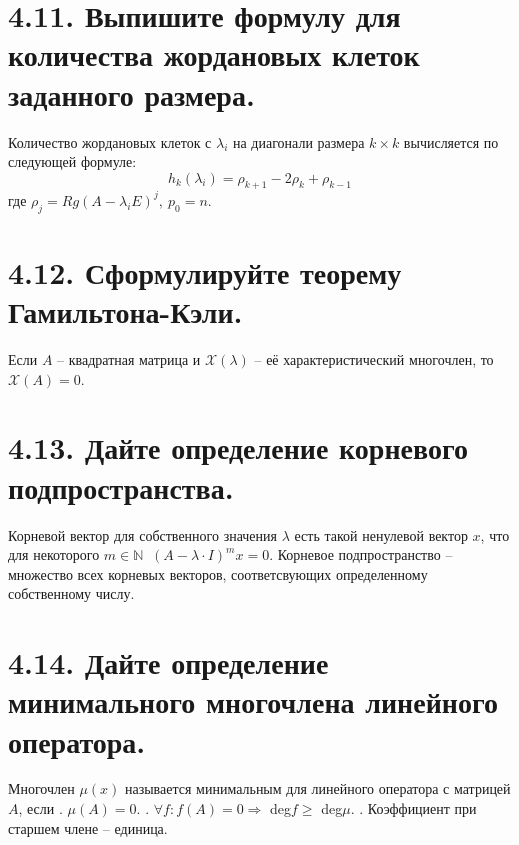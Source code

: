 \documentclass{article}
\begin{document}
\section*{\LARGE 4.11. Выпишите формулу для количества жордановых клеток заданного размера.}
Количество жордановых клеток с $\lambda_i$ на диагонали размера $k \times k$ вычисляется по следующей формуле:
$$
h_k(\lambda_i) = \rho_{k + 1} - 2\rho_k + \rho_{k - 1}
$$
где $\rho_j = Rg(A - \lambda_i E)^j, \: p_0 = n$.

\section*{\LARGE 4.12. Сформулируйте теорему Гамильтона-Кэли.}
Если $A$ -- квадратная матрица и $\mathcal{X}(\lambda)$ -- её характеристический многочлен, то $\mathcal{X}(A) = 0$.

\section*{\LARGE 4.13. Дайте определение корневого подпространства.}
Корневой вектор для собственного значения $\lambda$ есть такой ненулевой вектор $x$, что для некоторого $m \in \mathbb{N} \;\; (A - \lambda \cdot I)^m x = 0$.
\newline Корневое подпространство -- множество всех корневых векторов, соответсвующих определенному собственному числу.

\section*{\LARGE 4.14. Дайте определение минимального многочлена линейного оператора.}
Многочлен $\mu (x)$ называется минимальным для линейного оператора с матрицей $A$, если 
. $\mu (A) = 0$.
. $\forall f : f(A) = 0 \Rightarrow $ deg$f \ge$ deg$\mu$.
. Коэффициент при старшем члене -- единица.

\end{document}
